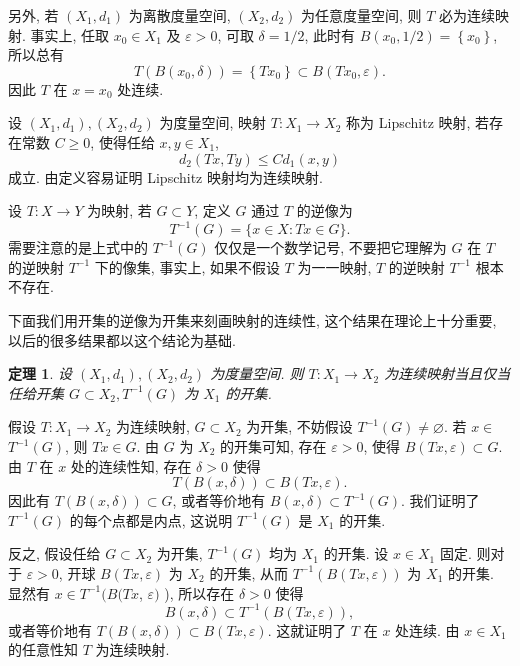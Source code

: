 \documentclass[openany]{ctexbook}
\makeatletter
\theoremstyle{kaiti}
\newtheorem{theorem}{定理}[section]
\theoremstyle{normal}
\renewenvironment{proof}[1][\proofname]{\par
    \pushQED{\qed}%
    \normalfont \topsep6\p@\@plus6\p@\relax
    \trivlist
    \item\relax
    {\heiti #1}\hspace{2\labelsep}\ignorespaces
  }{%
    \popQED\endtrivlist\@endpefalse
  }
\makeatother
\begin{document}
另外, 若 $\left(X_1, d_1\right)$ 为离散度量空间, $\left(X_2, d_2\right)$ 为任意度量空间, 则 $T$ 必为连续映射. 事实上, 任取 $x_0 \in X_1$ 及 $\varepsilon>0$, 可取 $\delta=1 / 2$, 此时有 $B\left(x_0, 1 / 2\right)=\left\{x_0\right\}$, 所以总有
$$
T\left(B\left(x_0, \delta\right)\right)=\left\{T x_0\right\} \subset B\left(T x_0, \varepsilon\right).
$$
因此 $T$ 在 $x=x_0$ 处连续.

设 $\left(X_1, d_1\right),\left(X_2, d_2\right)$ 为度量空间, 映射 $T: X_1 \rightarrow X_2$ 称为 Lipschitz 映射, 若存在常数 $C \geqslant 0$, 使得任给 $x, y \in X_1$,
$$
d_2(T x, T y) \leqslant C d_1(x, y)
$$
成立. 由定义容易证明 Lipschitz 映射均为连续映射.

设 $T: X \rightarrow Y$ 为映射, 若 $G \subset Y$, 定义 $G$ 通过 $T$ 的逆像为
$$
T^{-1}(G)=\{x \in X: T x \in G\}.
$$
需要注意的是上式中的 $T^{-1}(G)$ 仅仅是一个数学记号, 不要把它理解为 $G$ 在 $T$ 的逆映射 $T^{-1}$ 下的像集, 事实上, 如果不假设 $T$ 为一一映射, $T$ 的逆映射 $T^{-1}$ 根本不存在.

下面我们用开集的逆像为开集来刻画映射的连续性, 这个结果在理论上十分重要, 以后的很多结果都以这个结论为基础.

\begin{theorem}
  设 $\left(X_1, d_1\right),\left(X_2, d_2\right)$ 为度量空间. 则 $T: X_1 \rightarrow X_2$ 为连续映射当且仅当任给开集 $G \subset X_2, T^{-1}(G)$ 为 $X_1$ 的开集.
\end{theorem}

\begin{proof}
假设 $T: X_1 \rightarrow X_2$ 为连续映射, $G \subset X_2$ 为开集, 不妨假设 $T^{-1}(G) \neq \varnothing$. 若 $x \in$ $T^{-1}(G)$, 则 $T x \in G$. 由 $G$ 为 $X_2$ 的开集可知, 存在 $\varepsilon>0$, 使得 $B(T x, \varepsilon) \subset G$. 由 $T$ 在 $x$ 处的连续性知, 存在 $\delta>0$ 使得
$$
T(B(x, \delta)) \subset B(T x, \varepsilon).
$$
因此有 $T(B(x, \delta)) \subset G$, 或者等价地有 $B(x, \delta) \subset T^{-1}(G)$. 我们证明了 $T^{-1}(G)$ 的每个点都是内点, 这说明 $T^{-1}(G)$ 是 $X_1$ 的开集.

反之, 假设任给 $G \subset X_2$ 为开集, $T^{-1}(G)$ 均为 $X_1$ 的开集. 设 $x \in X_1$ 固定. 则对于 $\varepsilon>0$, 开球 $B(T x, \varepsilon)$ 为 $X_2$ 的开集, 从而 $T^{-1}(B(T x, \varepsilon))$ 为 $X_1$ 的开集. 显然有 $x \in T^{-1}(B(T x$, $\varepsilon)$ ), 所以存在 $\delta>0$ 使得
$$
B(x, \delta) \subset T^{-1}(B(T x, \varepsilon)),
$$
或者等价地有 $T(B(x, \delta)) \subset B(T x, \varepsilon)$. 这就证明了 $T$ 在 $x$ 处连续. 由 $x \in X_1$ 的任意性知 $T$ 为连续映射.
\end{proof}
\end{document}
